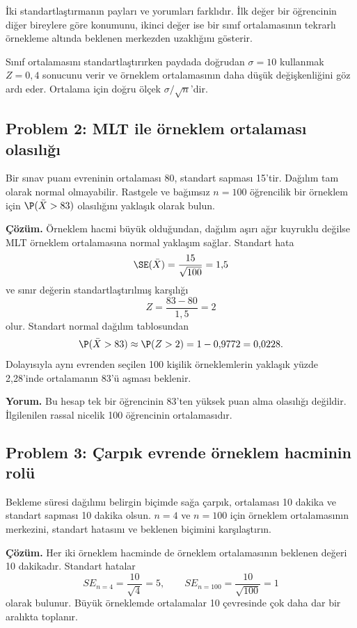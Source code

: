 İki standartlaştırmanın payları ve yorumları farklıdır. İlk değer bir
öğrencinin diğer bireylere göre konumunu, ikinci değer ise bir sınıf
ortalamasının tekrarlı örnekleme altında beklenen merkezden uzaklığını
gösterir.

\begin{mistakebox}
Sınıf ortalamasını standartlaştırırken paydada doğrudan $\sigma=10$
kullanmak $Z=0{,}4$ sonucunu verir ve örneklem ortalamasının daha düşük
değişkenliğini göz ardı eder. Ortalama için doğru ölçek $\sigma/\sqrt n$'dir.
\end{mistakebox}

\subsection*{Problem 2: MLT ile örneklem ortalaması olasılığı}

Bir sınav puanı evreninin ortalaması 80, standart sapması 15'tir. Dağılım tam
olarak normal olmayabilir. Rastgele ve bağımsız $n=100$ öğrencilik bir
örneklem için $\P(\bar X>83)$ olasılığını yaklaşık olarak bulun.

\textbf{Çözüm.} Örneklem hacmi büyük olduğundan, dağılım aşırı ağır kuyruklu
değilse MLT örneklem ortalamasına normal yaklaşım sağlar. Standart hata
\[
\SE(\bar X)=\frac{15}{\sqrt{100}}=1{,}5
\]
ve sınır değerin standartlaştırılmış karşılığı
\[
Z=\frac{83-80}{1{,}5}=2
\]
olur. Standart normal dağılım tablosundan
\[
\P(\bar X>83)\approx\P(Z>2)=1-0{,}9772=0{,}0228.
\]
Dolayısıyla aynı evrenden seçilen 100 kişilik örneklemlerin yaklaşık yüzde
2,28'inde ortalamanın 83'ü aşması beklenir.

\textbf{Yorum.} Bu hesap tek bir öğrencinin 83'ten yüksek puan alma
olasılığı değildir. İlgilenilen rassal nicelik 100 öğrencinin ortalamasıdır.

\subsection*{Problem 3: Çarpık evrende örneklem hacminin rolü}

Bekleme süresi dağılımı belirgin biçimde sağa çarpık, ortalaması 10 dakika ve
standart sapması 10 dakika olsun. $n=4$ ve $n=100$ için örneklem ortalamasının
merkezini, standart hatasını ve beklenen biçimini karşılaştırın.

\textbf{Çözüm.} Her iki örneklem hacminde de örneklem ortalamasının beklenen
değeri 10 dakikadır. Standart hatalar
\[
SE_{n=4}=\frac{10}{\sqrt4}=5,
\qquad
SE_{n=100}=\frac{10}{\sqrt{100}}=1
\]
olarak bulunur. Büyük örneklemde ortalamalar 10 çevresinde çok daha dar bir
aralıkta toplanır.

